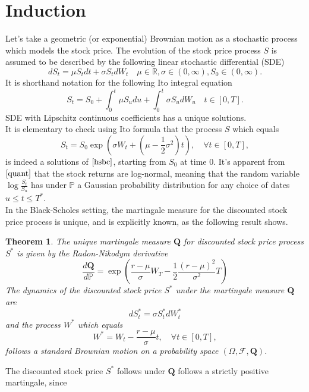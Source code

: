\documentclass{book}
\newtheorem{theorem}{Theorem}[section]
\begin{document}
\section{Induction}
Let's take a geometric (or exponential) Brownian motion as a stochastic process which models the stock price. 
The evolution of the stock price process $S$ is assumed to be described by the following linear stochastic differential (SDE)
\begin{equation}
\label{hsbc}
dS_{t}=\mu S_{t}dt+\sigma S_{t}dW_{t}\quad\mu\in\mathbb{R},\sigma\in(0,\infty),S_{0}\in(0,\infty).
\end{equation}
It is shorthand notation for the following Ito integral equation
$$
S_{t}=S_{0}+\int_{0}^{t}\mu S_{u}du+\int_{0}^{t}\sigma S_{u}dW_{u}\quad t\in[0,T].
$$
SDE with Lipschitz continuous coefficients has a unique solutions. \\
It is elementary to check using Ito formula that the process $S$ which equals
\begin{equation}
\label{quant}
S_{t}=S_{0}\exp(\sigma W_{t}+(\mu-\frac{1}{2}\sigma^{2})t),\quad \forall t\in[0,T],
\end{equation}
is indeed a solutions of $\eqref{hsbc}$, starting from $S_{0}$ at time $0$.
It's apparent from $\eqref{quant}$ that the stock returns are log-normal, meaning that the random variable $\log\frac{S_{t}}{S_{u}}$ has under $\mathbb{P}$ a Gaussian probability distribution for any choice of dates $u\leq t\leq T^{\ast}$.\\
In the Black-Scholes setting, the martingale measure for the discounted stock price process is unique, and is explicitly known, as the following result shows.
\begin{theorem}
The unique martingale measure $\mathbf{Q}$ for discounted stock price process $S^{\ast}$ is given by the Radon-Nikodym derivative
$$
\frac{d\mathbf{Q}}{d\mathbb{P}}=\exp\left(\frac{r-\mu}{\sigma}W_{T}-\frac{1}{2}\frac{(r-\mu)^{2}}{\sigma^{2}}T\right)
$$
The dynamics of the discounted stock price $S^{\ast}$ under the martingale measure $\mathbf{Q}$ are
\begin{equation}
dS^{\ast}_{t}=\sigma S^{\ast}_{t}dW^{\ast}_{t}
\end{equation}
and the process $W^{\ast}$ which equals
$$
W^{\ast}=W_{t}-\frac{r-\mu}{\sigma}t,\quad \forall t\in[0,T],
$$
follows a standard Brownian motion on a probability space $(\varOmega,\mathcal{F},\mathbf{Q})$.
\end{theorem}
The discounted stock price $S^{\ast}$ follows under $\mathbf{Q}$ follows a strictly positive martingale, since
\end{document}
